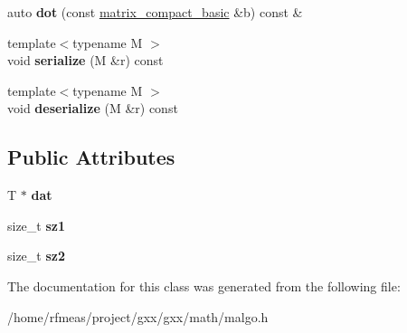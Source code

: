 \begin{DoxyCompactItemize}
\item 
auto {\bfseries dot} (const \hyperlink{classmalgo_1_1matrix__compact__basic}{matrix\+\_\+compact\+\_\+basic} \&b) const \&\hypertarget{classmalgo_1_1matrix__compact__basic_a98caebdd0e6c3d492303605fbeed1570}{}\label{classmalgo_1_1matrix__compact__basic_a98caebdd0e6c3d492303605fbeed1570}

\item 
{\footnotesize template$<$typename M $>$ }\\void {\bfseries serialize} (M \&r) const \hypertarget{classmalgo_1_1matrix__compact__basic_a56d9d8ddfc794b090dfc53ae687e9762}{}\label{classmalgo_1_1matrix__compact__basic_a56d9d8ddfc794b090dfc53ae687e9762}

\item 
{\footnotesize template$<$typename M $>$ }\\void {\bfseries deserialize} (M \&r) const \hypertarget{classmalgo_1_1matrix__compact__basic_ab6ecb8c18180de1efaf3bf42fb5a60da}{}\label{classmalgo_1_1matrix__compact__basic_ab6ecb8c18180de1efaf3bf42fb5a60da}

\end{DoxyCompactItemize}
\subsection*{Public Attributes}
\begin{DoxyCompactItemize}
\item 
T $\ast$ {\bfseries dat}\hypertarget{classmalgo_1_1matrix__compact__basic_ac757b457f71d6e687612424cee168108}{}\label{classmalgo_1_1matrix__compact__basic_ac757b457f71d6e687612424cee168108}

\item 
size\+\_\+t {\bfseries sz1}\hypertarget{classmalgo_1_1matrix__compact__basic_a0dced4efcb799136e928062b4e7fd1c6}{}\label{classmalgo_1_1matrix__compact__basic_a0dced4efcb799136e928062b4e7fd1c6}

\item 
size\+\_\+t {\bfseries sz2}\hypertarget{classmalgo_1_1matrix__compact__basic_abf07571e5602284b55aa18c37ad79855}{}\label{classmalgo_1_1matrix__compact__basic_abf07571e5602284b55aa18c37ad79855}

\end{DoxyCompactItemize}


The documentation for this class was generated from the following file\+:\begin{DoxyCompactItemize}
\item 
/home/rfmeas/project/gxx/gxx/math/malgo.\+h\end{DoxyCompactItemize}
